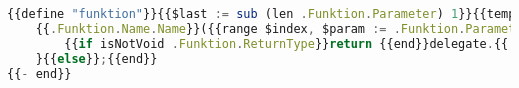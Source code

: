 \documentclass[./einleitung.tex]{subfiles}
\begin{document}
    \begin{lstlisting}[language=Typescript, caption=Template für die Generierung einer TypeScript Funktion, label=lst:templateTsFunktion]
{{define "funktion"}}{{$last := sub (len .Funktion.Parameter) 1}}{{template "comment_tab" .Funktion.Kommentar}}
    {{.Funktion.Name.Name}}({{range $index, $param := .Funktion.Parameter}}{{variableName $param}}: ~\\~{{variableType $param  $.ImportKontext}}{{if ne $last $index}}, {{end}}{{end}}){{if isNotVoid .Funktion.ReturnType}}: ~\\~{{variableType .Funktion.ReturnType .ImportKontext}}{{else}}: void{{end}}{{if .ImportKontext.HasDelegate}} {
        {{if isNotVoid .Funktion.ReturnType}}return {{end}}delegate.{{.Funktion.Name.Name}}(this~\\~{{range $index, $param := .Funktion.Parameter}}, {{variableName $param}}{{end}});
    }{{else}};{{end}}
{{- end}}
    \end{lstlisting}

    
\end{document}
